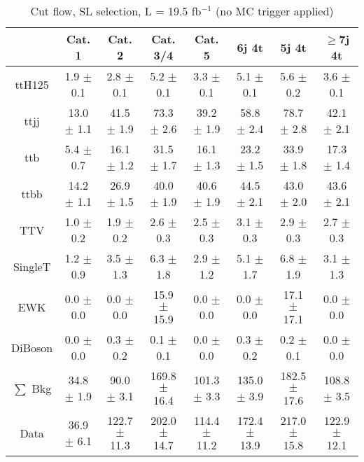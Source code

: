 \documentclass{article}
\begin{document}
        \begin{table*}[htbp]
        \begin{center}
\label{tab:cutflow}
\begin{tabular}{| c| c| c| c| c| c| c| c| }
\hline
 & Cat. 1  & Cat. 2  & Cat. 3/4  & Cat. 5  & 6j 4t  & 5j 4t  & $\ge$7j 4t \\ \hline
ttH125 &  1.9 $\pm$ 0.1  &  2.8 $\pm$ 0.1  &  5.2 $\pm$ 0.1  &  3.3 $\pm$ 0.1  &  5.1 $\pm$ 0.1  &  5.6 $\pm$ 0.2  &  3.6 $\pm$ 0.1 \\
ttjj &  13.0 $\pm$ 1.1  &  41.5 $\pm$ 1.9  &  73.3 $\pm$ 2.6  &  39.2 $\pm$ 1.9  &  58.8 $\pm$ 2.4  &  78.7 $\pm$ 2.8  &  42.1 $\pm$ 2.1 \\
ttb &  5.4 $\pm$ 0.7  &  16.1 $\pm$ 1.2  &  31.5 $\pm$ 1.7  &  16.1 $\pm$ 1.3  &  23.2 $\pm$ 1.5  &  33.9 $\pm$ 1.8  &  17.3 $\pm$ 1.4 \\
ttbb &  14.2 $\pm$ 1.1  &  26.9 $\pm$ 1.5  &  40.0 $\pm$ 1.9  &  40.6 $\pm$ 1.9  &  44.5 $\pm$ 2.1  &  43.0 $\pm$ 2.0  &  43.6 $\pm$ 2.1 \\
TTV &  1.0 $\pm$ 0.2  &  1.9 $\pm$ 0.2  &  2.6 $\pm$ 0.3  &  2.5 $\pm$ 0.3  &  3.1 $\pm$ 0.3  &  2.9 $\pm$ 0.3  &  2.7 $\pm$ 0.3 \\
SingleT &  1.2 $\pm$ 0.9  &  3.5 $\pm$ 1.3  &  6.3 $\pm$ 1.8  &  2.9 $\pm$ 1.2  &  5.1 $\pm$ 1.7  &  6.8 $\pm$ 1.9  &  3.1 $\pm$ 1.3 \\
EWK &  0.0 $\pm$ 0.0  &  0.0 $\pm$ 0.0  &  15.9 $\pm$ 15.9  &  0.0 $\pm$ 0.0  &  0.0 $\pm$ 0.0  &  17.1 $\pm$ 17.1  &  0.0 $\pm$ 0.0 \\
DiBoson &  0.0 $\pm$ 0.0  &  0.3 $\pm$ 0.2  &  0.1 $\pm$ 0.1  &  0.0 $\pm$ 0.0  &  0.3 $\pm$ 0.2  &  0.2 $\pm$ 0.1  &  0.0 $\pm$ 0.0 \\
\hline
$\sum$ Bkg &  34.8 $\pm$ 1.9  &  90.0 $\pm$ 3.1  &  169.8 $\pm$ 16.4  &  101.3 $\pm$ 3.3  &  135.0 $\pm$ 3.9  &  182.5 $\pm$ 17.6  &  108.8 $\pm$ 3.5 \\
\hline
Data &  36.9 $\pm$ 6.1  &  122.7 $\pm$ 11.3  &  202.0 $\pm$ 14.7  &  114.4 $\pm$ 11.2  &  172.4 $\pm$ 13.9  &  217.0 $\pm$ 15.8  &  122.9 $\pm$ 12.1 \\
\hline

        \end{tabular}

\caption{Cut flow, SL selection,   L = 19.5 fb$^{-1}$  (no MC trigger applied)  }
   
     \end{center}
        \end{table*}

        
\end{document}
